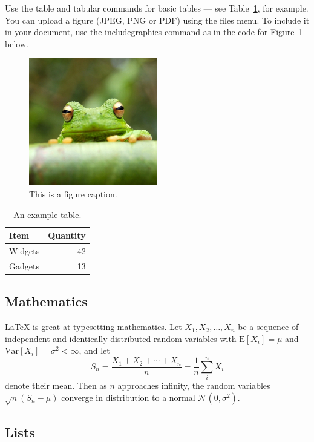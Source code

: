 Use the table and tabular commands for basic tables --- see Table~\ref{tab:widgets}, for example. You can upload a figure (JPEG, PNG or PDF) using the files menu. To include it in your document, use the includegraphics command as in the code for Figure~\ref{fig:frog} below.

\begin{figure}
\centering
\includegraphics[width=0.5\textwidth]{frog.jpg}
\caption{\label{fig:frog}This is a figure caption.}
\end{figure}

\begin{table}
\centering
\begin{tabular}{l|r}
Item & Quantity \\\hline
Widgets & 42 \\
Gadgets & 13
\end{tabular}
\caption{\label{tab:widgets}An example table.}
\end{table}

\subsection{Mathematics}

\LaTeX{} is great at typesetting mathematics. Let $X_1, X_2, \ldots, X_n$ be a sequence of independent and identically distributed random variables with $\text{E}[X_i] = \mu$ and $\text{Var}[X_i] = \sigma^2 < \infty$, and let
$$S_n = \frac{X_1 + X_2 + \cdots + X_n}{n}
      = \frac{1}{n}\sum_{i}^{n} X_i$$
denote their mean. Then as $n$ approaches infinity, the random variables $\sqrt{n}(S_n - \mu)$ converge in distribution to a normal $\mathcal{N}(0, \sigma^2)$.

\subsection{Lists}

